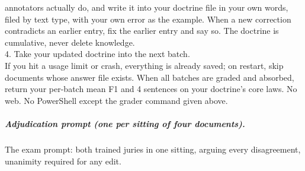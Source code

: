 \documentclass[11pt]{article}
\begin{document}
\begin{tcolorbox}[colback=white, boxrule=0.4pt, left=3pt, right=3pt, top=3pt, bottom=3pt]
annotators actually do, and write it into your doctrine file in your own words, filed by
text type, with your own error as the example. When a new correction contradicts an
earlier entry, fix the earlier entry and say so. The doctrine is cumulative, never delete
knowledge.\\
4. Take your updated doctrine into the next batch.\\
If you hit a usage limit or crash, everything is already saved; on restart, skip
documents whose answer file exists. When all batches are graded and absorbed, return your
per-batch mean F1 and 4 sentences on your doctrine's core laws. No web. No PowerShell
except the grader command given above.
\end{tcolorbox}

\subparagraph{Adjudication prompt (one per sitting of four documents).} The exam
prompt: both trained juries in one sitting, arguing every disagreement, unanimity
required for any edit.
\end{document}
